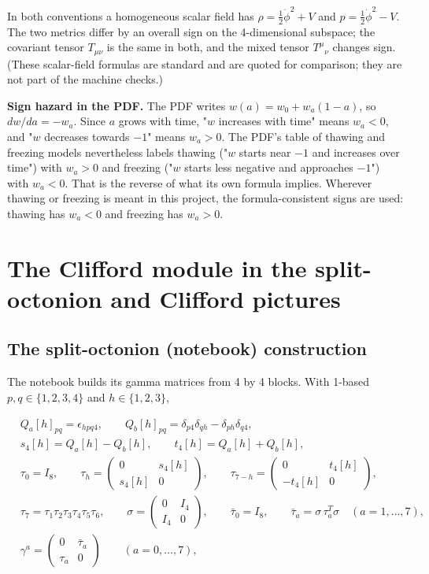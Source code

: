 \documentclass[11pt]{article}
\begin{document}
In both conventions a homogeneous scalar field has $\rho=\tfrac12\dot\phi^2+V$ and $p=\tfrac12\dot\phi^2-V$. The two metrics differ by an overall sign on the 4-dimensional subspace; the covariant tensor $T_{\mu\nu}$ is the same in both, and the mixed tensor $T^\mu{}_\nu$ changes sign. (These scalar-field formulas are standard and are quoted for comparison; they are not part of the machine checks.)

\textbf{Sign hazard in the PDF.} The PDF writes $w(a)=w_0+w_a(1-a)$, so $dw/da=-w_a$. Since $a$ grows with time, "$w$ increases with time" means $w_a<0$, and "$w$ decreases towards $-1$" means $w_a>0$. The PDF's table of thawing and freezing models nevertheless labels thawing ("$w$ starts near $-1$ and increases over time") with $w_a>0$ and freezing ("$w$ starts less negative and approaches $-1$") with $w_a<0$. That is the reverse of what its own formula implies. Wherever thawing or freezing is meant in this project, the formula-consistent signs are used: thawing has $w_a<0$ and freezing has $w_a>0$.

\section{The Clifford module in the split-octonion and Clifford pictures}

\subsection{The split-octonion (notebook) construction}

The notebook builds its gamma matrices from 4 by 4 blocks. With 1-based $p,q\in\{1,2,3,4\}$ and $h\in\{1,2,3\}$,

\[
\begin{aligned}
&Q_a[h]_{pq}=\epsilon_{hpq4},\qquad Q_b[h]_{pq}=\delta_{p4}\delta_{qh}-\delta_{ph}\delta_{q4},\\
&s_4[h]=Q_a[h]-Q_b[h],\qquad t_4[h]=Q_a[h]+Q_b[h],\\
&\tau_0=I_8,\qquad \tau_h=\begin{pmatrix}0&s_4[h]\\ s_4[h]&0\end{pmatrix},\qquad \tau_{7-h}=\begin{pmatrix}0&t_4[h]\\ -t_4[h]&0\end{pmatrix},\\
&\tau_7=\tau_1\tau_2\tau_3\tau_4\tau_5\tau_6,\qquad \sigma=\begin{pmatrix}0&I_4\\ I_4&0\end{pmatrix},\qquad \bar\tau_0=I_8,\qquad \bar\tau_a=\sigma\,\tau_a^T\sigma\quad(a=1,\dots,7),\\
&\gamma^a=\begin{pmatrix}0&\bar\tau_a\\ \tau_a&0\end{pmatrix}\qquad(a=0,\dots,7),
\end{aligned}
\]
\end{document}
